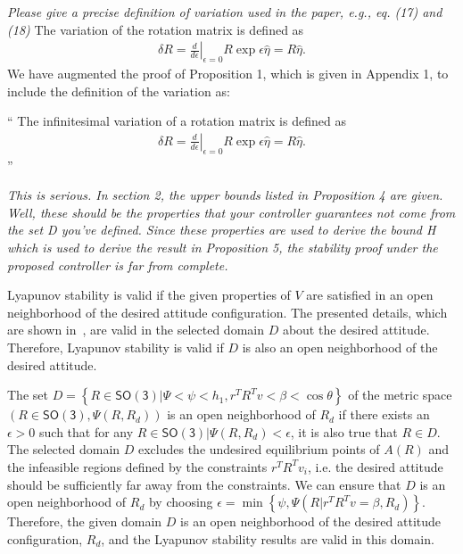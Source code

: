 \documentclass[11pt]{article}
\newcommand{\braces}[1]{\ensuremath{\left\{ #1 \right\}}}
\newcommand{\parenth}[1]{\ensuremath{\left( #1 \right)}}
\newcommand{\diff}[2]{\ensuremath{\frac{d #1}{d #2}}}
\newcommand{\SO}{\ensuremath{\mathsf{SO(3)}}}
\newenvironment{correction}{\begin{list}{}{\setlength{\leftmargin}{1cm}\setlength{\rightmargin}{1cm}}\vspace{\parsep}\item[]``}{''\end{list}}
\begin{document}
\begin{enumerate}
\item \textit{Please give a precise definition of variation used in the paper, e.g., eq. (17) and (18)}
The variation of the rotation matrix is defined as
\begin{align*}
    \delta R = \left. \diff{}{\epsilon} \right|_{\epsilon=0} R \exp{\epsilon \hat{\eta}} = R \hat{\eta} .
\end{align*}
We have augmented the proof of Proposition 1, which is given in Appendix 1, to include the definition of the variation as:
\begin{correction}
The infinitesimal variation of a rotation matrix is defined as
\begin{align*}
    \delta R = \left. \diff{}{\epsilon} \right|_{\epsilon=0} R \exp{\epsilon \hat{\eta}} = R \hat{\eta} .
\end{align*}
\end{correction}

\item \textit{This is serious. In section 2, the upper bounds listed in Proposition 4 are given. Well, these should be the properties that your controller guarantees not come from the set D you've defined. Since these properties are used to derive the bound H which is used to derive the result in Proposition 5, the stability proof under the proposed controller is far from complete.}

Lyapunov stability is valid if the given properties of \( V \) are satisfied in an open neighborhood of the desired attitude configuration. 
The presented details, which are shown in~, are valid in the selected domain \( D \) about the desired attitude.
Therefore, Lyapunov stability is valid if \( D \) is also an open neighborhood of the desired attitude.

The set \( D = \braces{R \in \SO \vert \Psi < \psi < h_1, r^T R^T v < \beta < \cos \theta} \) of the metric space \( \parenth{R \in \SO, \Psi(R,R_d)} \) is an open neighborhood of \( R_d \) if there exists an \( \epsilon > 0 \) such that for any \( R \in \SO | \Psi(R,R_d) < \epsilon \), it is also true that \( R \in D \).
The selected domain \( D \) excludes the undesired equilibrium points of \( A(R) \) and the infeasible regions defined by the constraints \( r^T R^T v_i \), i.e. the desired attitude should be sufficiently far away from the constraints. 
We can ensure that \( D \) is an open neighborhood of \( R_d \) by choosing \( \epsilon = \min \braces{\psi, \Psi(R|r^T R^T v = \beta,R_d)}\).
Therefore, the given domain \( D \) is an open neighborhood of the desired attitude configuration, \(R_d\), and the Lyapunov stability results are valid in this domain.


\end{enumerate}
\end{document}
